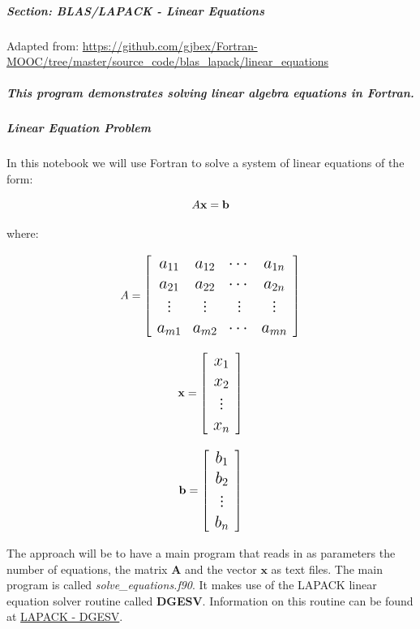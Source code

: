 \subparagraph{Section: BLAS/LAPACK - Linear Equations}

Adapted from: \href{https://github.com/gjbex/Fortran-MOOC/tree/master/source\_code/blas\_lapack/linear\_equations}{https://github.com/gjbex/Fortran-MOOC/tree/master/source\_code/blas\_lapack/linear\_equations}

\subparagraph{This program demonstrates solving linear algebra equations in Fortran.}

\subparagraph{Linear Equation Problem}

In this notebook we will use Fortran to solve a system of linear equations of the form:

\begin{equation}
\Large A \mathbf{x} = \mathbf{b}
\end{equation}

where: \newline

\begin{equation}
\Large A =
\left[
\begin{array}{cccc}
a_{11} & a_{12} & \cdots & a_{1n} \\
a_{21} & a_{22} & \cdots & a_{2n} \\
\vdots & \vdots & \vdots & \vdots \\
a_{m1} & a_{m2} & \cdots & a_{mn}
\end{array}
\right]
\end{equation}

\begin{equation}
\Large \mathbf{x} =
\left[
\begin{array}{c}
x_{1}  \\
x_{2}  \\
\vdots \\
x_{n}
\end{array}
\right]
\end{equation}

\begin{equation}
\Large \mathbf{b} = 
\left[
\begin{array}{c}
b_{1}  \\
b_{2}  \\
\vdots \\
b_{n}
\end{array}
\right]
\end{equation}

The approach will be to have a main program that reads in as parameters the number of equations, the matrix $\mathbf{A}$ and the vector $\mathbf{x}$ as text files.  The main program is called \textit{solve\_equations.f90}.  It makes use of the LAPACK linear equation solver routine called \textbf{DGESV}.  Information on this routine can be found at \href{https://netlib.org/lapack/}{LAPACK - DGESV}.

